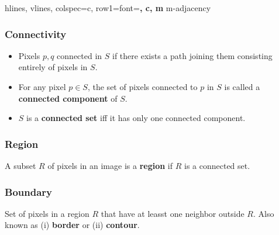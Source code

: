 \begin{minipage}{0.3\linewidth}
  \begin{tblr}{
      hlines, vlines,
      colspec={c},
      row{1}={font=\bfseries, c, m}
    }
    m-adjacency \\
  \end{tblr}
\end{minipage}

\subsubsection*{Connectivity}

\begin{itemize}
  \item Pixels $p, q$ connected in $S$ if there exists a path joining
    them consisting entirely of pixels in $S$.
  \item For any pixel $p \in S$, the set of pixels connected to $p$
    in $S$ is called a \textbf{connected component} of $S$.
  \item $S$ is a \textbf{connected set} iff it has only one connected component.
\end{itemize}

\subsubsection*{Region}

A subset $R$ of pixels in an image is a \textbf{region} if $R$ is a
connected set.

\subsubsection*{Boundary}

Set of pixels in a region $R$ that have at leasst one neighbor
outside $R$. Also known as (i) \textbf{border} or (ii) \textbf{contour}.

